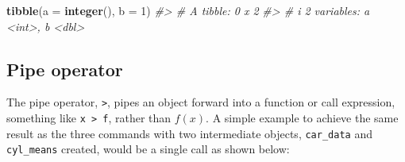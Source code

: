 \documentclass[
]{book}
\newenvironment{Shaded}{\begin{snugshade}}{\end{snugshade}}
\newcommand{\AttributeTok}[1]{\textcolor[rgb]{0.13,0.29,0.53}{#1}}
\newcommand{\CommentTok}[1]{\textcolor[rgb]{0.56,0.35,0.01}{\textit{#1}}}
\newcommand{\DecValTok}[1]{\textcolor[rgb]{0.00,0.00,0.81}{#1}}
\newcommand{\FunctionTok}[1]{\textcolor[rgb]{0.13,0.29,0.53}{\textbf{#1}}}
\newcommand{\NormalTok}[1]{#1}
\begin{document}
\begin{Shaded}
\begin{Highlighting}[]
\FunctionTok{tibble}\NormalTok{(}\AttributeTok{a =} \FunctionTok{integer}\NormalTok{(), }\AttributeTok{b =} \DecValTok{1}\NormalTok{)}
\CommentTok{\#\textgreater{} \# A tibble: 0 x 2}
\CommentTok{\#\textgreater{} \# i 2 variables: a \textless{}int\textgreater{}, b \textless{}dbl\textgreater{}}
\end{Highlighting}
\end{Shaded}

\subsection{Pipe operator}\label{pipe-operator}

The pipe operator, \texttt{\textbar{}\textgreater{}}, pipes an object forward into a function or call expression, something like \texttt{x\ \textbar{}\textgreater{}\ f}, rather than \(f(x)\). A simple example to achieve the same result as the three commands with two intermediate objects, \texttt{car\_data} and \texttt{cyl\_means} created, would be a single call as shown below:
\end{document}
